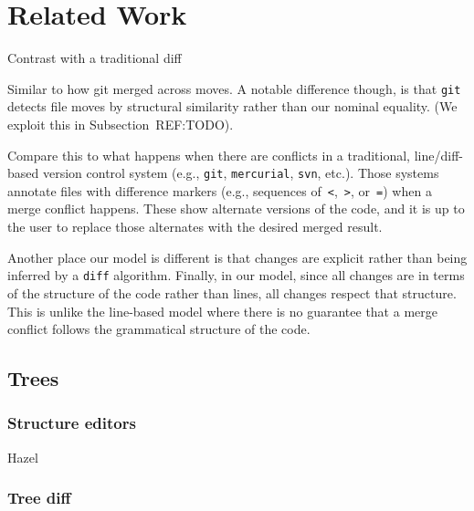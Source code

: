 
\section{Related Work}%
\label{sec:Related Work}

Contrast with a traditional diff

Similar to how git merged across moves.
A notable difference though, is that \texttt{git} detects
file moves by structural similarity rather than
our nominal equality.
(We exploit this in Subsection~REF:TODO).

Compare this to what happens when there are conflicts in a traditional,
line/diff-based version control system (e.g., \texttt{git}, \texttt{mercurial}, \texttt{svn}, etc.).
Those systems annotate files with difference markers (e.g., sequences of~\texttt{<},~\texttt{>}, or~\texttt{=})
when a merge conflict happens.
These show alternate versions of the code, and it is up to the user
to replace those alternates with the desired merged result.

Another place our model is different
is that changes are explicit rather than being inferred by a \texttt{diff} algorithm.
Finally, in our model, since all changes are in terms of
the structure of the code rather than lines,
all changes respect that structure.
This is unlike the line-based model where there is no guarantee
that a merge conflict follows the grammatical structure of the code.

\subsection{Trees}

\subsubsection{Structure editors}

Hazel~\citep{Omar:2019:10.1145/3290327}

\subsubsection{Tree diff}





